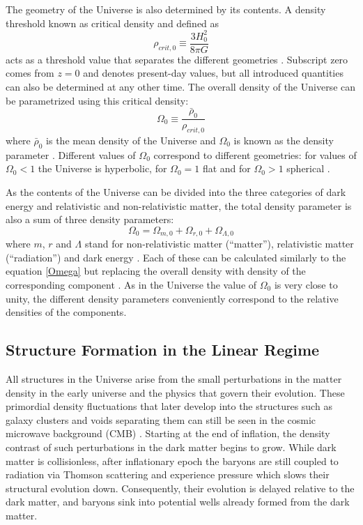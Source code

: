 \documentclass[english, twoside]{HYgradu}
\begin{document}
The geometry of the Universe is also determined by its contents. A density threshold known as critical density and defined as
\begin{equation}
\rho_{crit,0} \equiv \frac{3H_0^2}{8\pi G}
\end{equation}
acts as a threshold value that separates the different geometries \citep{mo2010galaxy}. Subscript zero comes from $z=0$ and denotes present-day values, but all introduced quantities can also be determined at any other time. The overall density of the Universe can be parametrized using this critical density:
\begin{equation} \label{Omega}
\Omega_0 \equiv \frac{\bar \rho_0}{\rho_{crit,0}}
\end{equation}
where $\bar\rho_0$ is the mean density of the Universe and $\Omega_0$ is known as the density parameter \citep{mo2010galaxy}. Different values of $\Omega_0$ correspond to different geometries: for values of $\Omega_0 < 1$ the Universe is hyperbolic, for $\Omega_0 = 1$ flat and for  $\Omega_0 > 1$ spherical \citep{mo2010galaxy}.

As the contents of the Universe can be divided into the three categories of dark energy and relativistic and non-relativistic matter, the total density parameter is also a sum of three density parameters:
\begin{equation}
\Omega_0 = \Omega_{m,0} + \Omega_{r, 0} + \Omega_{\Lambda, 0}
\end{equation}
where $m$, $r$ and $\Lambda$ stand for non-relativistic matter (``matter''), relativistic matter (``radiation'') and dark energy \citep{mo2010galaxy}. Each of these can be calculated similarly to the equation \ref{Omega} but replacing the overall density with density of the corresponding component \citep{mo2010galaxy}. As in the Universe the value of $\Omega_0$ is very close to unity, the different density parameters conveniently correspond to the relative densities of the components.


\subsection{Structure Formation in the Linear Regime} \label{universe-structure}
All structures in the Universe arise from the small perturbations in the matter density in the early universe and the physics that govern their evolution. These primordial density fluctuations that later develop into the structures such as galaxy clusters and voids separating them can still be seen in the cosmic microwave background (CMB) \citep{planck2016resultsI}. Starting at the end of inflation, the density contrast of such perturbations in the dark matter begins to grow. While dark matter is collisionless, after inflationary epoch the baryons are still coupled to radiation via Thomson scattering and experience pressure which slows their structural evolution down. Consequently, their evolution is delayed relative to the dark matter, and baryons sink into potential wells already formed from the dark matter.
\end{document}
